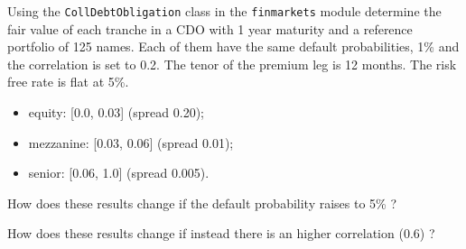 \begin{Exercise}[title={(Synthetic CDO)}]
Using the \texttt{CollDebtObligation} class in the \texttt{finmarkets} module determine the fair value of each tranche in a CDO with 1 year maturity and a reference portfolio of 125 names. Each of them have the same default probabilities, 1\% and the correlation is set to 0.2. The tenor of the premium leg is 12 months. The risk free rate is flat at 5\%.
\begin{itemize}
	\item equity: [0.0, 0.03] (spread 0.20);
	\item mezzanine: [0.03, 0.06] (spread 0.01);
	\item senior: [0.06, 1.0] (spread 0.005).
\end{itemize}

How does these results change if the default probability raises to 5\% ?

How does these results change if instead there is an higher correlation (0.6) ?
\end{Exercise}

